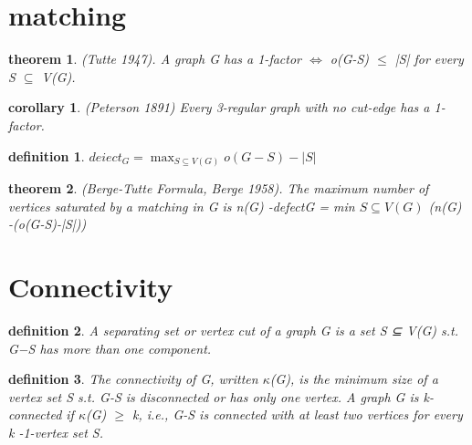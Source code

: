 \documentclass[twocolumn]{article}
\title{}
\newtheorem{theorem}{theorem}[section]  %
\newtheorem{definition}{definition}
\newtheorem{corollary}{corollary}
\begin{document}
\begin{CJK*}{UTF8}{bkai}


\section{matching}
    \begin{theorem}
     (Tutte 1947). A graph G has a 1-factor $\iff$ 
     o(G-S) $\leq$ |S| for every S $\subseteq $ V(G).
    \end{theorem}

    \begin{corollary}
       (Peterson 1891) Every 3-regular graph with no cut-edge has a 1-factor.  
    \end{corollary}

    \begin{definition}
        $deiect_{G} = \max _{S \subseteq V(G)} o(G-S)-|S|$
    \end{definition}

    \begin{theorem}
        (Berge-Tutte Formula, Berge 1958). The maximum number of vertices saturated by a matching in G is
 n(G) -defectG = min
 $S \subseteq V(G)$
 (n(G) -(o(G-S)-|S|))
    \end{theorem}

\section{Connectivity}

    \begin{definition}{}
         A separating set or vertex cut of a graph G is a set S ⊆ V(G) s.t. G−S has
 more than one component.
    \end{definition}

    \begin{definition}
         The connectivity of G, written $\kappa$(G), is the minimum size of a vertex set S s.t.
 G-S is disconnected or has only one vertex. A graph G is k-connected if
 $\kappa$(G) $\geq$ k, i.e., G-S is connected with at least two vertices for every
 k -1-vertex set S.
    \end{definition}


\end{CJK*}
\end{document}

